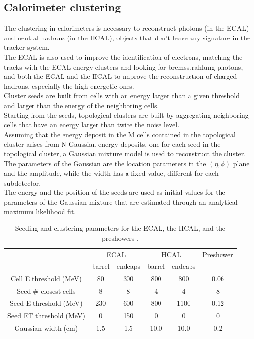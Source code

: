 \subsection{Calorimeter clustering}
The clustering in calorimeters is necessary to reconstruct photons (in the ECAL) and neutral hadrons (in the HCAL), objects that don't leave any signature in the tracker system.\\
The ECAL is also used to improve the identification of electrons, matching the tracks with the ECAL energy clusters and looking for bremsstrahlung photons, and both the ECAL and the HCAL to improve the reconstruction of charged hadrons, especially the high energetic ones.\\
Cluster seeds are built from cells with an energy larger than a given threshold and
larger than the energy of the neighboring cells.\\
Starting from the seeds, topological clusters are built by aggregating neighboring cells that have an energy larger than twice the noise level.\\
Assuming that the energy deposit in the M cells contained in the topological cluster arises from N Gaussian energy deposits, one for each seed in the topological cluster, a Gaussian mixture model is used to reconstruct the cluster. The parameters of the Gaussian are the location parameters in the $(\eta,\phi)$ plane and the amplitude, while the width has a fixed value, different for each subdetector.\\
The energy and the position of the seeds are used as initial values for the parameters of the Gaussian mixture that are estimated through an analytical maximum likelihood fit.\\

\begin{table}[h!]
    \centering
    \begin{tabular}{|c|cc|cc|c|}
    \hline
    &\multicolumn{2}{c|}{ECAL} & \multicolumn{2}{c|}{HCAL} & Preshower\\
    &barrel&endcaps&barrel&endcaps& \\
    \hline
    Cell E threshold (MeV)&80&300&800&800&0.06\\
    Seed \# closest cells&8&8&4&4&8\\
    Seed E threshold (MeV)&230&600&800&1100&0.12\\
    Seed ET threshold (MeV)&0&150&0&0&0\\
    Gaussian width (cm)&1.5&1.5&10.0&10.0&0.2\\
    \hline
    \end{tabular}
    \caption{Seeding and clustering parameters for the ECAL, the HCAL, and the preshowers \cite{Sirunyan2017Particle-flowDetector}.}
    \label{tab:clustering}
\end{table}

